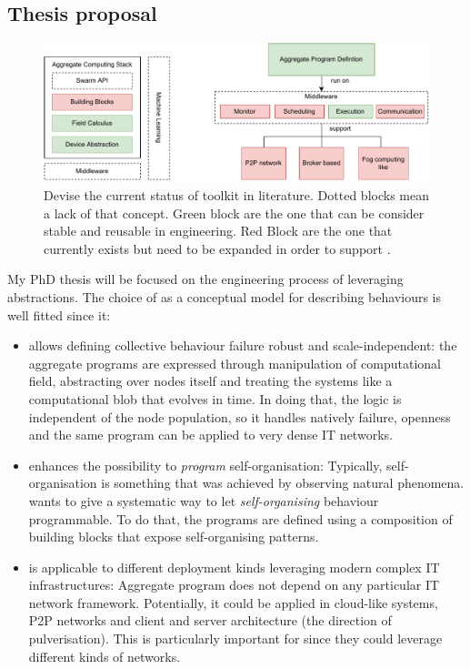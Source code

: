 \documentclass[11pt]{article}
\begin{document}
\subsection{Thesis proposal}
\begin{figure}
	\centering
	\includegraphics[width=\textwidth]{img/to-do-for-thesis.pdf}
	\caption{Devise the current status of \ac{} toolkit in literature. Dotted blocks mean a lack of that concept. Green block are the one that can be consider stable and reusable in \cpsw{} engineering. Red Block are the one that currently exists but need to be expanded in order to support \cpsw{}.}
	\label{fig:current-state}
\end{figure}
My PhD thesis will be focused on the engineering process of \cpsw{} leveraging \ac{} abstractions. The choice of \ac{} as a conceptual model for describing \cpsw{} behaviours is well fitted since it:
\begin{itemize}
	\item allows defining collective behaviour failure robust and scale-independent: the aggregate programs are expressed through manipulation of computational field, abstracting over nodes itself and treating the systems like a computational blob that evolves in time. In doing that, the logic is independent of the node population, so it handles natively failure, openness and the same program can be applied to very dense IT networks.
	\item enhances the possibility to \textit{program} self-organisation: Typically, self-organisation is something that was achieved by observing natural phenomena. \ac{} wants to give a systematic way to let \textit{self-organising} behaviour programmable. To do that, the programs are defined using a composition of building blocks that expose self-organising patterns.
	\item is applicable to different deployment kinds leveraging modern complex IT infrastructures: Aggregate program does not depend on any particular IT network framework. Potentially, it could be applied in cloud-like systems, P2P networks and client and server architecture (the direction of pulverisation). This is particularly important for \cpsw{} since they could leverage different kinds of networks.
\end{itemize}
\end{document}
